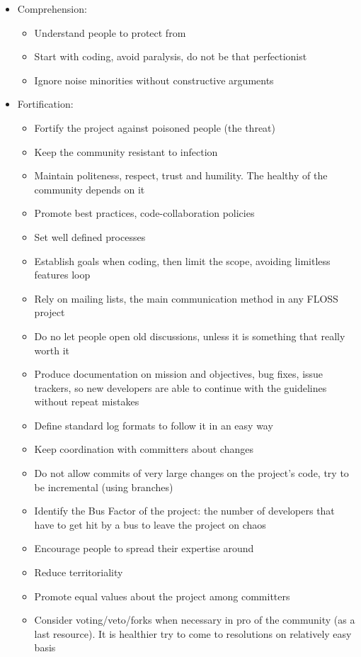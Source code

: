 \documentclass[11pt]{article} %
\begin{document}
\begin{itemize}
  \item Comprehension:
  	\begin{itemize}
  		\item Understand people to protect from
  		\item Start with coding, avoid paralysis, do not be that perfectionist
  		\item Ignore noise minorities without constructive arguments
  	\end{itemize}
  
  \item Fortification:
  	\begin{itemize}
  		\item Fortify the project against poisoned people (the threat)
  		\item Keep the community resistant to infection
  		\item Maintain politeness, respect, trust and humility. The healthy of the community depends on it
  		\item Promote best practices, code-collaboration policies
  		\item Set well defined processes
  		\item Establish goals when coding, then limit the scope, avoiding limitless features loop
  		\item Rely on mailing lists, the main communication method in any FLOSS project
  		\item Do no let people open old discussions, unless it is something that really worth it
  		\item Produce documentation on mission and objectives, bug fixes, issue trackers, so new developers are able to continue with the guidelines without repeat mistakes
  		\item Define standard log formats to follow it in an easy way
  		\item Keep coordination with committers about changes
  		\item Do not allow commits of very large changes on the project's code, try to be incremental (using branches)
  		\item Identify the Bus Factor of the project: the number of developers that have to get hit by a bus to leave the project on chaos
  		\item Encourage people to spread their expertise around
  		\item Reduce territoriality
  		\item Promote equal values about the project among committers
  		\item Consider voting/veto/forks when necessary in pro of the community (as a last resource). It is healthier try to come to resolutions on relatively easy basis
  	\end{itemize}
  	

\end{itemize}
\end{document}
